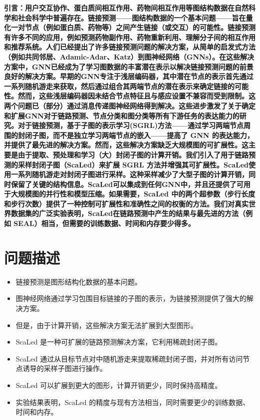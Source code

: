 \documentclass{article}
\begin{document}
\textbf{引言：用户交互协作、蛋白质间相互作用、药物间相互作用等图结构数据在自然科学和社会科学中普遍存在。链接预测——图结构数据的一个基本问题——旨在量化一对节点（例如蛋白质、药物等）之间产生链接（或交互）的可能性。链接预测有许多不同的应用，例如预测药物副作用、药物重新利用、理解分子间的相互作用和推荐系统。人们已经提出了许多链接预测问题的解决方案，从简单的启发式方法（例如共同邻居、Adamic-Adar、Katz）到图神经网络（GNNs）。在这些解决方案中，GNN已经成为了学习图数据的丰富潜在表示以解决链接预测问题的前景良好的解决方案。早期的GNN专注于浅层编码器，其中潜在节点的表示首先通过一系列随机游走来获取，然后通过组合其两端节点的潜在表示来确定链接的可能性。然而，这些浅层编码器因未结合节点特征且与感应设置不兼容而受到限制。这两个问题已（部分）通过消息传递图神经网络得到解决。这些进步激发了关于确定和扩展GNN对于链路预测、节点分类和图分类等所有下游任务的表达能力的研究。对于链接预测，基于子图的表示学习(SGRL)方法——通过学习两端节点周围的封闭子图，而不是独立学习两端节点的嵌入——提高了 GNN 的表达能力，并提供了最先进的解决方案。然而，这些解决方案缺乏大规模图的可扩展性。这主要是由于提取、预处理和学习（大）封闭子图的计算开销。我们引入了用于链路预测的采样封闭子图（ScaLed）来扩展 SGRL 方法并增强其可扩展性。ScaLed使用一系列随机游走对封闭子图进行采样。这种采样减少了大型子图的计算开销，同时保留了关键的结构信息。ScaLed可以集成到任何GNN中，并且还提供了可用于大规模图的并行性和模型压缩。如果需要，ScaLed 中的两个超参数（步行长度和步行次数）提供了一种控制可扩展性和准确性之间的权衡的方法。我们对真实世界数据集的广泛实验表明，ScaLed在链路预测中产生的结果与最先进的方法（例如 SEAL）相当，但需要的训练数据、时间和内存要少得多。}
\section*{问题描述}
\begin{itemize}
    \item 链接预测是图形结构化数据的基本问题。
    \item 图神经网络通过学习包围目标链接的子图的表示，为链接预测提供了强大的解决方案。
    \item 但是，由于计算开销，这些解决方案无法扩展到大型图形。
    \item ScaLed 是一种可扩展的链路预测解决方案，它利用稀疏封闭子图。
    \item ScaLed 通过从目标节点对中随机游走来提取稀疏封闭子图，并对所有访问节点诱导的采样子图进行操作。
    \item ScaLed 可以扩展到更大的图形，计算开销更少，同时保持高精度。
    \item 实验结果表明，ScaLed 的精度与现有方法相当，同时需要更少的训练数据、时间和内存。
\end{itemize}
\end{document}
